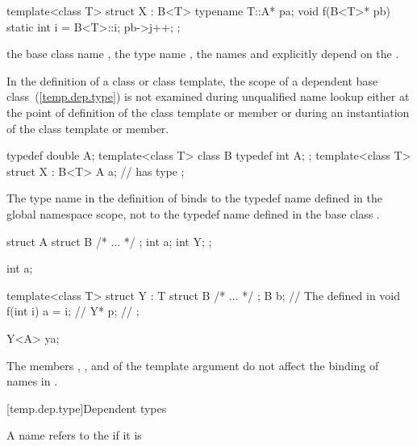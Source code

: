 \pnum
\enterexample
\begin{codeblock}
template<class T> struct X : B<T> {
  typename T::A* pa;
  void f(B<T>* pb) {
    static int i = B<T>::i;
    pb->j++;
  }
};
\end{codeblock}

the base class name
,
the type name
,
the names
and
explicitly depend on the
.
\exitexample

\pnum
In the definition of a class or class template,
the scope of a dependent base class~(\ref{temp.dep.type})
is not examined during unqualified
name lookup either at the point of definition of the
class template or member or during an instantiation of
the class template or member.
\enterexample

\begin{codeblock}
typedef double A;
template<class T> class B {
  typedef int A;
};
template<class T> struct X : B<T> {
  A a;              //  has type 
};
\end{codeblock}

The type name
in the definition of
binds to the typedef name defined in the global
namespace scope, not to the typedef name
defined in the base class
.
\exitexample
\enterexample

\begin{codeblock}
struct A {
  struct B { /* ... */ };
  int a;
  int Y;
};

int a;

template<class T> struct Y : T {
  struct B { /* ... */ };
  B b;                          // The  defined in 
  void f(int i) { a = i; }      // 
  Y* p;                         // 
};

Y<A> ya;
\end{codeblock}

The members
,
,
and
of the template argument
do not affect the binding of names in
.
\exitexample

[temp.dep.type]{Dependent types}

\pnum
A name refers to the
if it is

